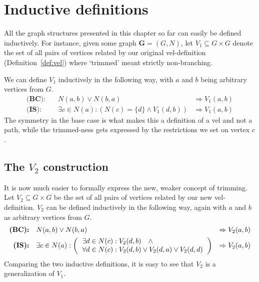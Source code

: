 


\section{Inductive definitions}
\label{sec:Inductive definitions}
All the graph structures presented in this chapter so far can easily be defined inductively.
For instance, given some graph $\mathbf{G}=(G,N)$, let $V_1 \subseteq G \times G$ denote the set of all pairs of vertices related by our original vel-definition (Definition~\ref{def:vel}) where `trimmed' meant strictly non-branching.

We can define $V_1$ inductively in the following way, with $a$ and $b$ being arbitrary vertices from $G$.
\begin{align}
  \textbf{(BC):}&\quad N(a,b) \vee N(b,a) &\Rightarrow  V_1(a,b)\\
  \textbf{(IS):}&\quad \exists c \in N(a): (N(c) =\{d\} \wedge V_1(d,b)) &\Rightarrow V_1(a,b)
\end{align}
The symmetry in the base case is what makes this a definition of a vel and not a path, while the trimmed-ness gets expressed by the restrictions we set on vertex $c$.

\subsection{The $V_2$ construction}
\label{sub:The V2 construction}
It is now  much easier to formally express the new, weaker concept of trimming.
Let $V_2 \subseteq G \times G$ be the set of all pairs of vertices related by our new vel-definition.
$V_2$ can be defined inductively in the following way, again with $a$ and $b$ as arbitrary vertices from $G$.
\begin{align}
  \textbf{(BC):}&\quad N(a,b) \vee N(b,a) &\Rightarrow V_2(a,b)\label{eq:V2_BC}\\
  \textbf{(IS):}&\quad \exists c \in N(a):
  \left ( \begin{tabular}{l}
  $\exists d \in N(c): V_2(d,b) \quad \wedge$\\
  $\forall d \in N(c): V_2(d,b) \vee V_2(d,a) \vee V_2(d,d)$
  \end{tabular} \right )
  &\Rightarrow V_2(a,b)\label{eq:V2_IS}
\end{align}
Comparing the two inductive definitions, it is easy to see that $V_2$ is a generalization of $V_1$.

